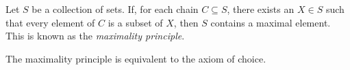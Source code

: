 \documentclass[12pt]{article}
\begin{document}
Let $S$ be a collection of sets.  If, for each chain $C \subseteq S$, there exists an $X \in S$ such that every element of $C$ is a subset of $X$, then $S$ contains a maximal element.  This is known as the \emph{maximality principle}.

The maximality principle is equivalent to the axiom of choice.
\end{document}
